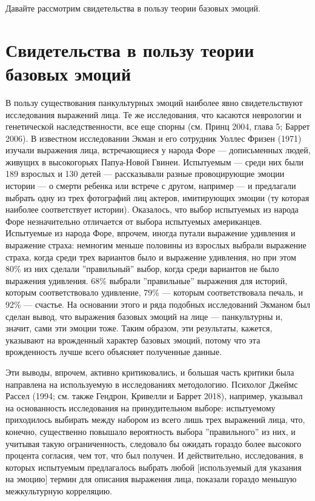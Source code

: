 \documentclass[11pt]{book}
\begin{document}
Давайте рассмотрим свидетельства в пользу теории базовых эмоций.

\section{Свидетельства в пользу теории базовых эмоций}

В пользу существования панкультурных эмоций наиболее явно свидетельствуют исследования выражений лица. Те же исследования, что касаются неврологии и генетической наследственности, все еще спорны (см. Принц 2004, глава 5; Баррет 2006). В известном исследовании Экман и его сотрудник Уоллес Фризен (1971) изучали выражения лица, встречающиеся у народа Форе --- дописьменных людей, живущих в высокогорьях Папуа-Новой Гвинеи. Испытуемым --- среди них были 189 взрослых и 130 детей --- рассказывали разные провоцирующие эмоции истории --- о смерти ребенка или встрече с другом, например --- и предлагали выбрать одну из трех фотографий лиц актеров, имитирующих эмоции (ту которая наиболее соответствует истории). Оказалось, что выбор испытуемых из народа Форе незначительно отличается от выбора испытуемых американцев. Испытуемые из народа Форе, впрочем, иногда путали выражение удивления и выражение страха: немногим меньше половины из взрослых выбрали выражение страха, когда среди трех вариантов было и выражение удивления, но при этом 80\% из них сделали ''правильный'' выбор, когда среди вариантов не было выражения удивления. 68\% выбрали ''правильные'' выражения для историй, которым соответствовало удивление, 79\% --- которым соответствовала печаль, и 92\% --- счастье. На основании этого и ряда подобных исследований Экманом был сделан вывод, что выражения базовых эмоций на лице --- панкультурны и, значит, сами эти эмоции тоже. Таким образом, эти результаты, кажется, указывают на врожденный характер базовых эмоций, потому что эта врожденность лучше всего объясняет полученные данные.

Эти выводы, впрочем, активно критиковались, и большая часть критики была направлена на используемую в исследованиях методологию. Психолог Джеймс Рассел (1994; см. также Гендрон, Кривелли и Баррет 2018), например, указывал на основанность исследования на принудительном выборе: испытуемому приходилось выбирать между набором из всего лишь трех выражений лица, что, конечно, существенно повышало вероятность выбора ''правильного'' из них, и учитывая такую ограниченность, следовало бы ожидать гораздо более высокого процента согласия, чем тот, что был получен. И действительно, исследования, в которых испытуемым предлагалось выбрать любой [используемый для указания на эмоцию] термин для описания выражения лица, показали гораздо меньшую межкультурную корреляцию.
\end{document}
